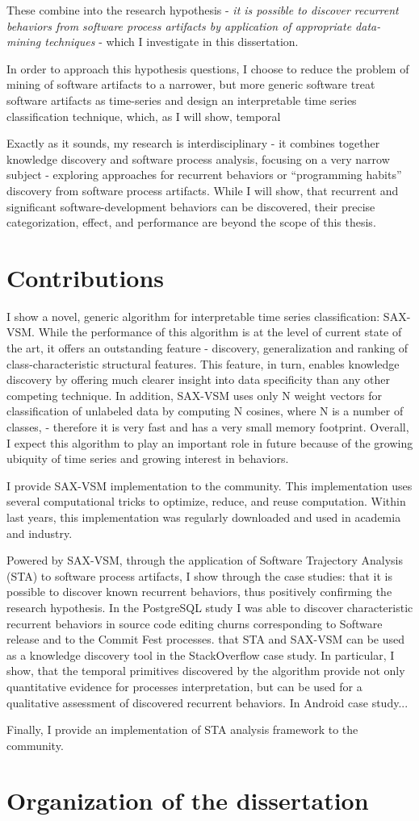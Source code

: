 These combine into the research hypothesis - \textit{it is possible to discover recurrent behaviors 
from software process artifacts by application of appropriate data-mining techniques} - 
which I investigate in this dissertation. 

In order to approach this hypothesis questions, I choose to reduce the problem of mining of software artifacts to a narrower,
but more generic software treat software artifacts as time-series and design an interpretable time 
series classification technique, which, 
as I will show, temporal 


Exactly as it sounds, my research is interdisciplinary - it combines together knowledge discovery and software process 
analysis, focusing on a very narrow subject - exploring approaches for recurrent behaviors or ``programming habits'' 
discovery from software process artifacts.
While I will show, that recurrent and significant software-development behaviors can be discovered,
their precise categorization, effect, and performance are beyond the scope of this thesis.

\section{Contributions}
I show a novel, generic algorithm for interpretable time series classification: SAX-VSM. 
While the performance of this algorithm is at the level of current state of the art, it offers an outstanding feature -
discovery, generalization and ranking of class-characteristic structural features. This feature, in turn, enables
knowledge discovery by offering much clearer insight into data specificity than any other competing technique.
In addition, SAX-VSM uses only N weight vectors for classification of unlabeled data by computing N cosines, where N is
a number of classes, - therefore it is very fast and has a very small memory footprint.
Overall, I expect this algorithm to play an important role in future because of the growing ubiquity of time series and
growing interest in behaviors.

I provide SAX-VSM implementation to the community. This implementation uses several computational tricks to optimize,
reduce, and reuse computation. Within last years, this implementation was regularly downloaded and used in academia and
industry. 

Powered by SAX-VSM, through the application of Software Trajectory Analysis (STA) to software process artifacts, I show
through the case studies: that it is possible to discover known recurrent behaviors, thus positively confirming the
research hypothesis. In the PostgreSQL study I was able to discover characteristic recurrent behaviors in source code
editing churns corresponding
to Software release and to the Commit Fest processes.
that STA and SAX-VSM can be used as a knowledge discovery tool in the StackOverflow case study. In particular, I show,
that the temporal primitives discovered by the algorithm provide not only quantitative evidence for processes
interpretation, but can be used for a qualitative assessment of discovered recurrent behaviors.
In Android case study...

Finally, I provide an implementation of STA analysis framework to the community. 

\section{Organization of the dissertation}